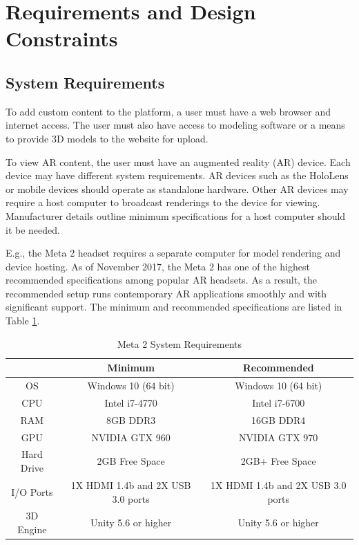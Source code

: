 
\section{Requirements and Design Constraints}

\subsection{System Requirements}

To add custom content to the platform, a user must have a web browser and internet access. The user must also have access to modeling software or a means to provide 3D models to the website for upload.

To view AR content, the user must have an augmented reality (AR) device. Each device may have different system requirements. AR devices such as the HoloLens or mobile devices should operate as standalone hardware. Other AR devices may require a host computer to broadcast renderings to the device for viewing. Manufacturer details outline minimum specifications for a host computer should it be needed.

E.g., the Meta 2 headset requires a separate computer for model rendering and device hosting. As of November 2017, the Meta 2 has one of the highest recommended specifications among popular AR headsets. As a result, the recommended setup runs contemporary AR applications smoothly and with significant support. The minimum and recommended specifications are listed in Table \ref{table:metatwosystemrequirements}.

\begin{table}[H]
	\centering
	\begin{tabular}{ | c | c | c | }
		\hline
		& Minimum & Recommended \\ \hline
		OS & Windows 10 (64 bit) & 	Windows 10 (64 bit) \\ \hline
		CPU & Intel i7-4770 & Intel i7-6700 \\ \hline
		RAM & 8GB DDR3 & 16GB DDR4 \\ \hline
		GPU & NVIDIA GTX 960 & NVIDIA GTX 970 \\ \hline
		Hard Drive & 2GB Free Space & 2GB+ Free Space \\ \hline
		I/O Ports & 1X HDMI 1.4b and 2X USB 3.0 ports & 1X HDMI 1.4b and 2X USB 3.0 ports \\ \hline
		3D Engine & Unity 5.6 or higher & Unity 5.6 or higher \\ \hline
	\end{tabular}

	\caption{Meta 2 System Requirements}
	\label{table:metatwosystemrequirements}
\end{table}

